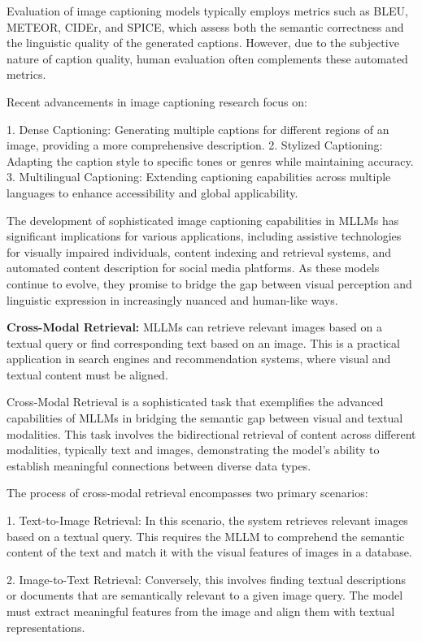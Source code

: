 Evaluation of image captioning models typically employs metrics such as BLEU, METEOR, CIDEr, and SPICE, which assess both the semantic correctness and the linguistic quality of the generated captions. However, due to the subjective nature of caption quality, human evaluation often complements these automated metrics.

Recent advancements in image captioning research focus on:

1. Dense Captioning: Generating multiple captions for different regions of an image, providing a more comprehensive description.
2. Stylized Captioning: Adapting the caption style to specific tones or genres while maintaining accuracy.
3. Multilingual Captioning: Extending captioning capabilities across multiple languages to enhance accessibility and global applicability.

The development of sophisticated image captioning capabilities in MLLMs has significant implications for various applications, including assistive technologies for visually impaired individuals, content indexing and retrieval systems, and automated content description for social media platforms. As these models continue to evolve, they promise to bridge the gap between visual perception and linguistic expression in increasingly nuanced and human-like ways.


\textbf{Cross-Modal Retrieval:} MLLMs can retrieve relevant images based on a textual query or find corresponding text based on an image. This is a practical application in search engines and recommendation systems, where visual and textual content must be aligned.

Cross-Modal Retrieval is a sophisticated task that exemplifies the advanced capabilities of MLLMs in bridging the semantic gap between visual and textual modalities. This task involves the bidirectional retrieval of content across different modalities, typically text and images, demonstrating the model's ability to establish meaningful connections between diverse data types.

The process of cross-modal retrieval encompasses two primary scenarios:

1. Text-to-Image Retrieval: In this scenario, the system retrieves relevant images based on a textual query. This requires the MLLM to comprehend the semantic content of the text and match it with the visual features of images in a database.

2. Image-to-Text Retrieval: Conversely, this involves finding textual descriptions or documents that are semantically relevant to a given image query. The model must extract meaningful features from the image and align them with textual representations.

